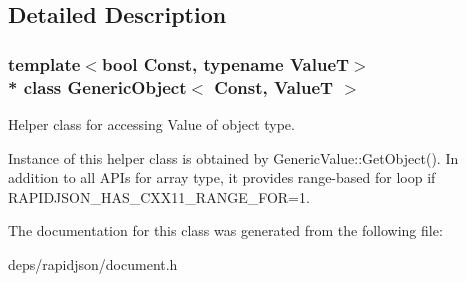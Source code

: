 \subsection{Detailed Description}
\subsubsection*{template$<$bool Const, typename ValueT$>$\\*
class Generic\+Object$<$ Const, Value\+T $>$}

Helper class for accessing Value of object type. 

Instance of this helper class is obtained by {\ttfamily Generic\+Value\+::\+Get\+Object()}. In addition to all A\+P\+Is for array type, it provides range-\/based for loop if {\ttfamily R\+A\+P\+I\+D\+J\+S\+O\+N\+\_\+\+H\+A\+S\+\_\+\+C\+X\+X11\+\_\+\+R\+A\+N\+G\+E\+\_\+\+F\+OR=1}. 

The documentation for this class was generated from the following file\+:\begin{DoxyCompactItemize}
\item 
deps/rapidjson/document.\+h\end{DoxyCompactItemize}
